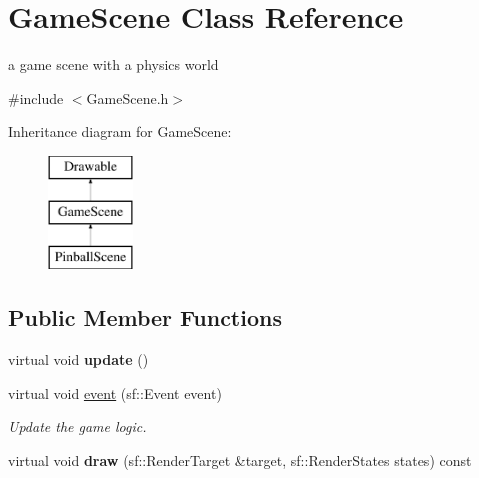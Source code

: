 \hypertarget{class_game_scene}{\section{Game\+Scene Class Reference}
\label{class_game_scene}
}


a game scene with a physics world  




{\ttfamily \#include $<$Game\+Scene.\+h$>$}

Inheritance diagram for Game\+Scene\+:\begin{figure}[H]
\begin{center}
\leavevmode
\includegraphics[height=3.000000cm]{class_game_scene}
\end{center}
\end{figure}
\subsection*{Public Member Functions}
\begin{DoxyCompactItemize}
\item 
\hypertarget{class_game_scene_ad0aa729b9dba3a8e09b2a8a61fcb3dce}{virtual void {\bfseries update} ()}\label{class_game_scene_ad0aa729b9dba3a8e09b2a8a61fcb3dce}

\item 
virtual void \hyperlink{class_game_scene_a9cf68fbf8e0805cbb1618a71e04d7fa4}{event} (sf\+::\+Event event)
\begin{DoxyCompactList}\small\item\em Update the game logic. \end{DoxyCompactList}\item 
\hypertarget{class_game_scene_a9b7472887a15c9c93f020d56872f8968}{virtual void {\bfseries draw} (sf\+::\+Render\+Target \&target, sf\+::\+Render\+States states) const }\label{class_game_scene_a9b7472887a15c9c93f020d56872f8968}

\end{DoxyCompactItemize}
